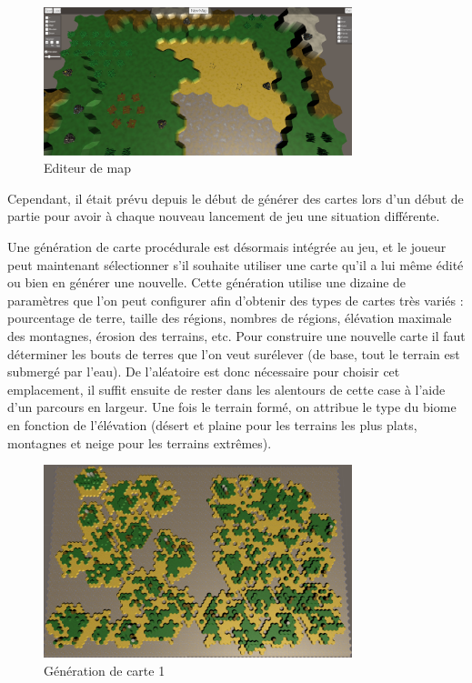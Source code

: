 \documentclass[12pt]{report}
\begin{document}
\begin{figure}[H]
    \centering
    \includegraphics[width=0.8\textwidth]{EditorScreen}
    \caption{Editeur de map}
\end{figure}

Cependant, il était prévu depuis le début de générer des cartes lors d'un début
de partie pour avoir à chaque nouveau lancement de jeu une situation différente.

Une génération de carte procédurale est désormais intégrée au jeu, et le joueur
peut maintenant sélectionner s'il souhaite utiliser une carte qu'il a lui même
édité ou bien en générer une nouvelle. Cette génération utilise une dizaine de
paramètres que l'on peut configurer afin d'obtenir des types de cartes très
variés : pourcentage de terre, taille des régions, nombres de régions, élévation
maximale des montagnes, érosion des terrains, etc. Pour construire une nouvelle
carte il faut déterminer les bouts de terres que l'on veut surélever (de base,
tout le terrain est submergé par l'eau). De l'aléatoire est donc nécessaire pour
choisir cet emplacement, il suffit ensuite de rester dans les alentours de cette
case à l'aide d'un parcours en largeur. Une fois le terrain formé, on attribue
le type du biome en fonction de l'élévation (désert et plaine pour les terrains
les plus plats, montagnes et neige pour les terrains extrêmes).

\begin{figure}[H]
    \centering
    \includegraphics[width=0.8\textwidth]{MapGen1}
    \caption{Génération de carte 1}
\end{figure}
\end{document}
